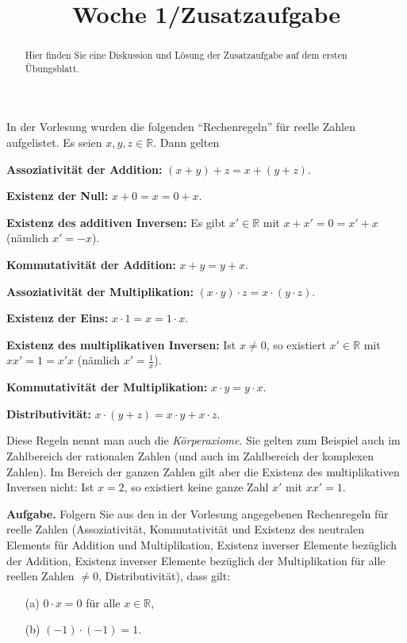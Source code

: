 \documentclass{ximera}
\title{Woche 1/Zusatzaufgabe}
\begin{document}
\begin{abstract}
Hier finden Sie eine Diskussion und Lösung der Zusatzaufgabe auf dem ersten Übungsblatt.
\end{abstract}
\maketitle

In der Vorlesung wurden die folgenden ``Rechenregeln'' für reelle Zahlen aufgelistet. Es seien $x, y, z\in \mathbb R$. Dann gelten

\textbf{Assoziativität der Addition:}
$(x+y) + z = x + (y+z)$.

\textbf{Existenz der Null:}
$x +0 = x = 0 + x$.

\textbf{Existenz des additiven Inversen:}
Es gibt $x'\in \mathbb R$ mit $x+x' = 0 = x'+x$ (nämlich $x'=-x$).

\textbf{Kommutativität der Addition:}
$x + y = y + x$.

\textbf{Assoziativität der Multiplikation:}
$(x\cdot y)\cdot z = x\cdot (y\cdot z)$.

\textbf{Existenz der Eins:}
$x\cdot 1 = x = 1\cdot x$.

\textbf{Existenz des multiplikativen Inversen:}
Ist $x\ne 0$, so existiert $x'\in \mathbb R$ mit $xx' = 1 = x'x$ (nämlich $x'=\frac 1x$).

\textbf{Kommutativität der Multiplikation:}
$x\cdot y = y\cdot x$.

\textbf{Distributivität:}
$x\cdot (y+z) = x\cdot y + x\cdot z$.

Diese Regeln nennt man auch die \emph{Körperaxiome}. Sie gelten zum Beispiel auch im Zahlbereich der rationalen Zahlen (und auch im Zahlbereich der komplexen Zahlen). Im Bereich der ganzen Zahlen gilt aber die Existenz des multiplikativen Inversen nicht: Ist $x=2$, so existiert keine ganze Zahl $x'$ mit $xx'=1$.


\textbf{Aufgabe.}
Folgern Sie aus den in der Vorlesung angegebenen Rechenregeln für reelle Zahlen (Assoziativität, Kommutativität und Existenz des neutralen Elements für Addition und Multiplikation, Existenz inverser Elemente bezüglich der Addition, Existenz inverser Elemente bezüglich der Multiplikation für alle reellen Zahlen $\ne 0$, Distributivität), dass gilt:
\begin{enumerate}
\item[(a)]
$0\cdot x = 0$ für alle $x\in \mathbb R$,
\item[(b)]
$(-1) \cdot (-1) = 1$.
\end{enumerate}
\end{document}
